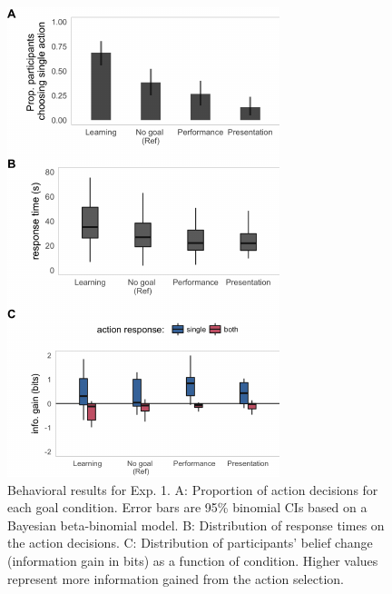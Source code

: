 \documentclass[10pt, letterpaper]{article}
\newenvironment{CodeChunk}{}{}
\begin{document}
\begin{CodeChunk}
\begin{figure}[H]

{\centering \includegraphics[width=0.86\linewidth]{figs/e1_behav_results_plot-1} 

}

\caption[Behavioral results for Exp]{Behavioral results for Exp. 1. A: Proportion of action decisions for each goal condition. Error bars are 95\% binomial CIs based on a Bayesian beta-binomial model. B: Distribution of response times on the action decisions. C: Distribution of participants' belief change (information gain in bits) as a function of condition. Higher values represent more information gained from the action selection.}\label{fig:e1_behav_results_plot}
\end{figure}
\end{CodeChunk}
\end{document}
